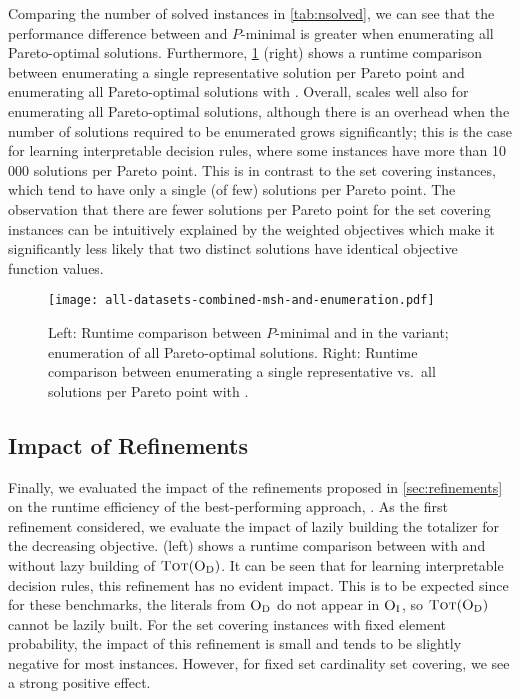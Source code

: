 Comparing the number of solved instances in \cref{tab:nsolved}, we can see that the performance difference between \algname{} and $P$-minimal is greater when enumerating all Pareto-optimal solutions.
Furthermore, \cref{fig:combined-msh-scatter-single-multi} (right) shows a runtime comparison between enumerating a single representative solution per Pareto point and enumerating all Pareto-optimal solutions with \msh{}.
Overall, \algname{} scales well also for enumerating all Pareto-optimal solutions, although there is an overhead when the number of solutions required to be enumerated grows significantly;
this is the case for learning interpretable decision rules, where some instances have more than 10\,000 solutions per Pareto point.
This is in contrast to the set covering instances, which tend to have only a single (of few) solutions per Pareto point.
The observation that there are fewer solutions per Pareto point for the set covering instances can be intuitively explained by the weighted objectives which make it significantly less likely that two distinct solutions have identical objective function values.

\begin{figure}
  \centering
  \texttt{[image: all-datasets-combined-msh-and-enumeration.pdf]}
  \caption{Left: Runtime comparison between $P$-minimal and \algname{} in the \msh{} variant; 
    enumeration of all Pareto-optimal solutions.
    Right: Runtime comparison between enumerating a single representative vs.\ all solutions per Pareto point with \msh{}.}\label{fig:combined-msh-scatter-single-multi}
\end{figure}

\subsection{Impact of Refinements\label{sec:res-ref}}

Finally, we evaluated the impact of the refinements proposed in \cref{sec:refinements} on the runtime efficiency of the best-performing approach, \msh{}.
As the first refinement considered, we evaluate the impact of lazily building the totalizer for the decreasing objective.
 (left) shows a runtime comparison between \msh{} with and without lazy building of $\textsc{Tot}(\textsc{O}_{\text{D}})$.
It can be seen that for learning interpretable decision rules, this refinement has no evident impact.
This is to be expected since for these benchmarks, the literals from $\textsc{O}_{\text{D}}$ do not appear in $\textsc{O}_{\text{I}}$, so $\textsc{Tot}(\textsc{O}_{\text{D}})$ cannot be lazily built.
For the set covering instances with fixed element probability, the impact of this refinement is small and tends to be slightly negative for most instances.
However, for fixed set cardinality set covering, we see a strong positive effect.


